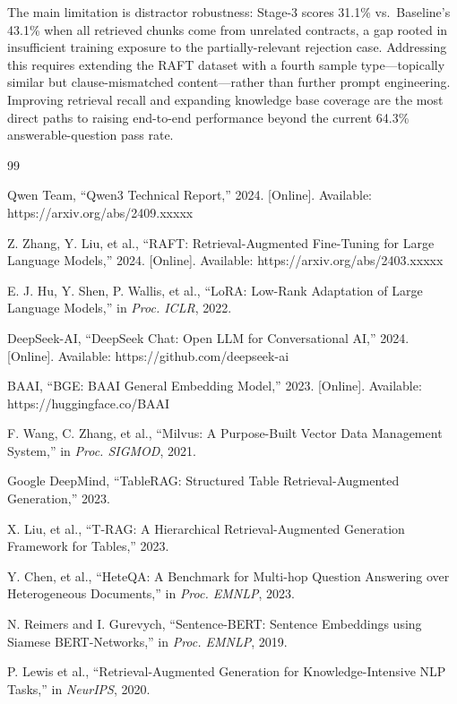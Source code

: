 \documentclass[10pt,conference]{IEEEtran}
\begin{document}
The main limitation is distractor robustness: Stage-3 scores 31.1\% vs.\ Baseline's 43.1\% when all retrieved chunks come from unrelated contracts, a gap rooted in insufficient training exposure to the partially-relevant rejection case.
Addressing this requires extending the RAFT dataset with a fourth sample type---topically similar but clause-mismatched content---rather than further prompt engineering.
Improving retrieval recall and expanding knowledge base coverage are the most direct paths to raising end-to-end performance beyond the current 64.3\% answerable-question pass rate.


\begin{thebibliography}{99}

Qwen Team, “Qwen3 Technical Report,” 2024. [Online]. Available: https://arxiv.org/abs/2409.xxxxx

Z. Zhang, Y. Liu, et al., “RAFT: Retrieval-Augmented Fine-Tuning for Large Language Models,” 2024. [Online]. Available: https://arxiv.org/abs/2403.xxxxx

E. J. Hu, Y. Shen, P. Wallis, et al., “LoRA: Low-Rank Adaptation of Large Language Models,” in \textit{Proc. ICLR}, 2022.

DeepSeek-AI, “DeepSeek Chat: Open LLM for Conversational AI,” 2024. [Online]. Available: https://github.com/deepseek-ai


BAAI, “BGE: BAAI General Embedding Model,” 2023. [Online]. Available: https://huggingface.co/BAAI

F. Wang, C. Zhang, et al., “Milvus: A Purpose-Built Vector Data Management System,” in \textit{Proc. SIGMOD}, 2021.

Google DeepMind, “TableRAG: Structured Table Retrieval-Augmented Generation,” 2023.

X. Liu, et al., “T-RAG: A Hierarchical Retrieval-Augmented Generation Framework for Tables,” 2023.

Y. Chen, et al., “HeteQA: A Benchmark for Multi-hop Question Answering over Heterogeneous Documents,” in \textit{Proc. EMNLP}, 2023.

N. Reimers and I. Gurevych, “Sentence-BERT: Sentence Embeddings using Siamese BERT-Networks,” in \textit{Proc. EMNLP}, 2019.

P. Lewis et al., “Retrieval-Augmented Generation for Knowledge-Intensive NLP Tasks,” in \textit{NeurIPS}, 2020.


\end{thebibliography}
\end{document}
